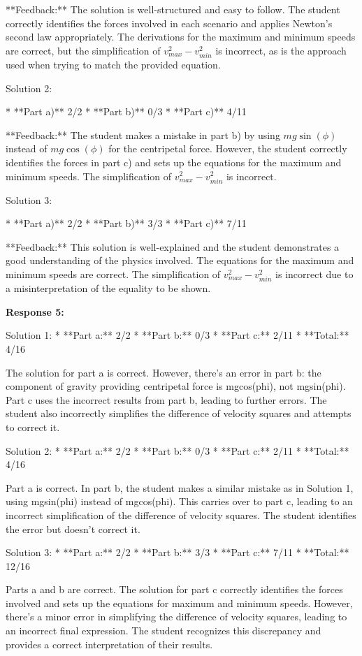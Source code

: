 \documentclass[a4paper,11pt]{article}
\begin{document}
**Feedback:** The solution is well-structured and easy to follow. The student correctly identifies the forces involved in each scenario and applies Newton's second law appropriately. The derivations for the maximum and minimum speeds are correct, but the simplification of \(v_{max}^2 - v_{min}^2\) is incorrect, as is the approach used when trying to match the provided equation.


Solution 2:

*   **Part a)** 2/2
*   **Part b)** 0/3
*   **Part c)** 4/11

**Feedback:** The student makes a mistake in part b) by using \(mg\sin(\phi)\) instead of \(mg\cos(\phi)\) for the centripetal force. However, the student correctly identifies the forces in part c) and sets up the equations for the maximum and minimum speeds. The simplification of \(v_{max}^2 - v_{min}^2\) is incorrect.

Solution 3:

*   **Part a)** 2/2
*   **Part b)** 3/3
*   **Part c)** 7/11

**Feedback:** This solution is well-explained and the student demonstrates a good understanding of the physics involved. The equations for the maximum and minimum speeds are correct. The simplification of \(v_{max}^2 - v_{min}^2\) is incorrect due to a misinterpretation of the equality to be shown.

\bigskip    
\textbf{Response 5:}

Solution 1:
* **Part a:** 2/2
* **Part b:** 0/3
* **Part c:** 2/11
* **Total:** 4/16

The solution for part a is correct. However, there's an error in part b: the component of gravity providing centripetal force is mgcos(phi), not mgsin(phi). Part c uses the incorrect results from part b, leading to further errors. The student also incorrectly simplifies the difference of velocity squares and attempts to correct it.

Solution 2:
* **Part a:** 2/2
* **Part b:** 0/3
* **Part c:** 2/11
* **Total:** 4/16

Part a is correct. In part b, the student makes a similar mistake as in Solution 1, using mgsin(phi) instead of mgcos(phi). This carries over to part c, leading to an incorrect simplification of the difference of velocity squares. The student identifies the error but doesn't correct it.

Solution 3:
* **Part a:** 2/2
* **Part b:** 3/3
* **Part c:** 7/11
* **Total:** 12/16

Parts a and b are correct. The solution for part c correctly identifies the forces involved and sets up the equations for maximum and minimum speeds. However, there's a minor error in simplifying the difference of velocity squares, leading to an incorrect final expression. The student recognizes this discrepancy and provides a correct interpretation of their results.
\end{document}
